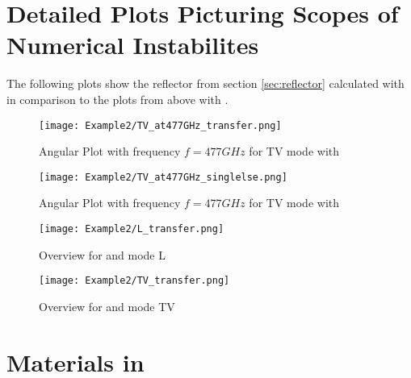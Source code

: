 \section{Detailed Plots Picturing Scopes of Numerical Instabilites}
The following plots show the reflector from section \ref{sec:reflector} 
calculated with  in comparison to the plots from above with 
.

\begin{figure}[p]
    \centering
    \texttt{[image: Example2/TV\_at477GHz\_transfer.png]}
    \caption{Angular Plot with frequency $f=477\si{GHz}$ for TV mode with }
    \label{fig:anTMM_TV}
\end{figure}
\begin{figure}[p]
    \centering
    \texttt{[image: Example2/TV\_at477GHz\_singlelse.png]}
    \caption{Angular Plot with frequency $f=477\si{GHz}$ for TV mode with }
    \label{fig:anLSE_TV}
\end{figure}

\begin{figure}[p]
    \centering
    \texttt{[image: Example2/L\_transfer.png]}
    \caption{Overview for  and mode L}
    \label{fig:ovTMM_L}
\end{figure}
\begin{figure}[p]
    \centering
    \texttt{[image: Example2/TV\_transfer.png]}
    \caption{Overview for  and mode TV}
    \label{fig:ovTMM_TV}
\end{figure}
 
\newpage
\section{Materials in  }


